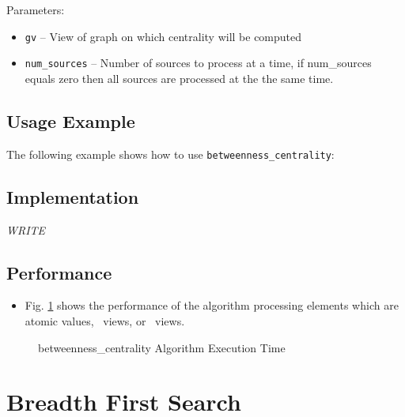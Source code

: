 Parameters:
\begin{itemize}
\item
\texttt{gv} --
View of graph on which centrality will be computed
\item
\texttt{num\_sources} --
Number of sources to process at a time, if num\_sources equals zero then all sources are processed at the the same time.
\end{itemize}

\subsection{Usage Example} \label{sec-betw-cent-alg-use}

The following example shows how to use 
\texttt{betweenness\_centrality}:


\subsection{Implementation} \label{sec-betw-cent-alg-impl}

\textit{WRITE}

\subsection{Performance} \label{sec-betw-cent-alg-perf}

\begin{itemize}
\item
Fig. \ref{fig:betw-cent-alg-exec-exper}
shows the performance of the algorithm processing
elements which are atomic values, \stl\ views, or \stapl\ views.
\end{itemize}

\begin{figure}[p]
\caption{betweenness\_centrality Algorithm Execution Time}
\label{fig:betw-cent-alg-exec-exper}
\end{figure}


\section{ Breadth First Search} 
\label{sec-br-first-alg}

